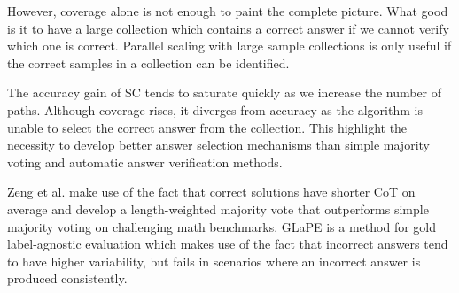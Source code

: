 However, coverage alone is not enough to paint the complete picture. What good is it to have a large collection which contains a correct answer
if we cannot verify which one is correct. Parallel scaling with large sample collections is only useful 
if the correct samples in a collection can be identified\cite{brown2024largelanguagemonkeysscaling}\cite{zeng2025revisitingtesttimescalingo1like}.

The accuracy gain of SC tends to saturate quickly as we increase the number of paths\cite{wang2023selfconsistencyimproveschainthought}.
Although coverage rises, it diverges\cite{brown2024largelanguagemonkeysscaling} from accuracy as the algorithm is unable to select the correct answer from the collection.
This highlight the necessity to develop better answer selection mechanisms than simple majority voting and automatic answer verification methods.

Zeng et al.\cite{zeng2025revisitingtesttimescalingo1like} make use of the fact that
correct solutions have shorter CoT on average and develop a length-weighted majority vote that outperforms simple majority voting on challenging math benchmarks. 
GLaPE\cite{zhang2024glapegoldlabelagnosticprompt} is a method for gold label-agnostic evaluation which makes use
of the fact that incorrect answers tend to have higher variability, but fails in scenarios where an incorrect answer is produced consistently. 

